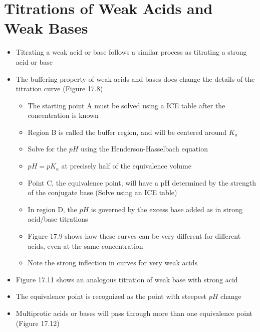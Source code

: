 \documentclass[12pt, openany, letterpaper]{memoir}
\begin{document}
\section{Titrations of Weak Acids and Weak Bases}
\begin{itemize}
	\item Titrating a weak acid or base follows a similar process as titrating a strong acid or base
	\item The buffering property of weak acids and bases does change the details of the titration curve (Figure 17.8)
	\begin{itemize}
		\item The starting point A must be solved using a ICE table after the concentration is known
		\item Region B is called the buffer region, and will be centered around $K_a$
		\item Solve for the $pH$ using the Henderson-Hasselbach equation
		\item $pH=pK_a$ at precisely half of the equivalence volume
		\item Point C, the equivalence point, will have a pH determined by the strength of the conjugate base (Solve using an ICE table)
		\item In region D, the $pH$ is governed by the excess base added as in strong acid/base titrations
		\item Figure 17.9 shows how these curves can be very different for different acids, even at the same concentration
		\item Note the strong inflection in curves for very weak acids
	\end{itemize}
	\item Figure 17.11 shows an analogous titration of weak base with strong acid
	\item The equivalence point is recognized as the point with steepest $pH$ change	
	\item Multiprotic acids or bases will pass through more than one equivalence point (Figure 17.12)
\end{itemize}
\end{document}
